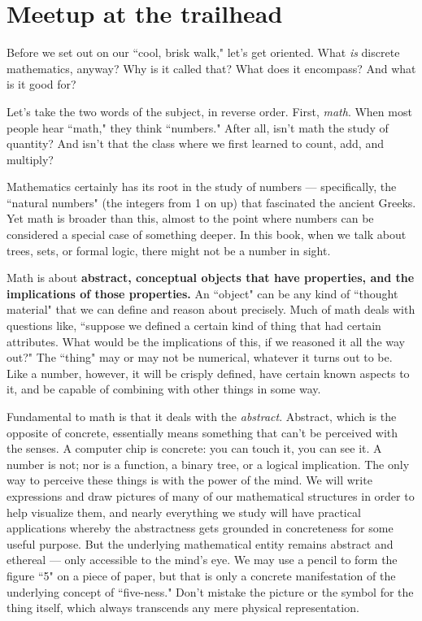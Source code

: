 
\chapter{Meetup at the trailhead}

Before we set out on our ``cool, brisk walk," let's get oriented. What
\textit{is} discrete mathematics, anyway? Why is it called that? What does
it encompass? And what is it good for?

Let's take the two words of the subject, in reverse order. First,
\textit{math}. When most people hear ``math," they think ``numbers." After
all, isn't math the study of quantity? And isn't that the class where we
first learned to count, add, and multiply?

Mathematics certainly has its root in the study of numbers ---
specifically, the ``natural numbers" (the integers from 1 on up) that
fascinated the ancient Greeks. Yet math is broader than this, almost to the
point where numbers can be considered a special case of something deeper.
In this book, when we talk about trees, sets, or formal logic, there might
not be a number in sight.

Math is about \textbf{abstract, conceptual objects that have
properties, and the implications of those properties.} An ``object" can be
any kind of ``thought material" that we can define and reason about
precisely. Much of math deals with questions like, ``suppose we defined a
certain kind of thing that had certain attributes.  What would be the
implications of this, if we reasoned it all the way out?" The ``thing" may
or may not be numerical, whatever it turns out to be. Like a number,
however, it will be crisply defined, have certain known aspects to it, and
be capable of combining with other things in some way.

Fundamental to math is that it deals with the \textit{abstract}. Abstract,
which is the opposite of concrete, essentially means something that can't
be perceived with the senses. A computer chip is concrete: you can touch
it, you can see it. A number is not; nor is a function, a binary tree, or a
logical implication. The only way to perceive these things is with the
power of the mind. We will write expressions and draw pictures of many of
our mathematical structures in order to help visualize them, and nearly
everything we study will have practical applications whereby the
abstractness gets grounded in concreteness for some useful purpose. But the
underlying mathematical entity remains abstract and ethereal --- only
accessible to the mind's eye. We may use a pencil to form the figure ``5"
on a piece of paper, but that is only a concrete manifestation of the
underlying concept of ``five-ness." Don't mistake the picture or the symbol
for the thing itself, which always transcends any mere physical
representation.

